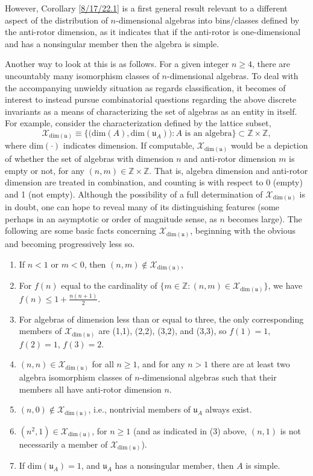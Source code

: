\documentclass{amsart}
\numberwithin{equation}{section}
\theoremstyle{definition}
\numberwithin{theorem}{section}
\begin{document}
However, Corollary \ref{8/17/22.1} is a first general result relevant to a different aspect of the distribution of $n$-dimensional algebras into bins/classes defined by the anti-rotor dimension, as it indicates that if the anti-rotor is one-dimensional and has a nonsingular member then the algebra is simple.  

Another way to look at this is as follows.
For a given integer $n\ge 4$, there are uncountably many isomorphism classes of $n$-dimensional algebras.  To deal with the accompanying unwieldy situation as regards classification, it becomes of interest to instead pursue combinatorial questions regarding the above discrete invariants as a means of characterizing the set of algebras as an entity in itself.   For example, consider the characterization defined by the lattice subset, \[ \mathcal{X}_{\text{dim}(\mathfrak{u})} \equiv \big\{\big(\text{dim}(A),\text{dim}(\mathfrak{u}_A)\big): A \text{ is an algebra}\big\} \subset \mathbb{Z}\times\mathbb{Z},\] where $\text{dim}(\cdot)$ indicates dimension.  If computable, $\mathcal{X}_{\text{dim}(\mathfrak{u})}$ would be a depiction of whether the set of algebras with dimension $n$ and anti-rotor dimension $m$ is empty or not, for any $(n,m)\in \mathbb{Z}\times\mathbb{Z}$.  That is, algebra dimension and anti-rotor dimension are treated in combination, and counting is with respect to 0 (empty) and 1 (not empty). Although the possibility of a full determination of $\mathcal{X}_{\text{dim}(\mathfrak{u})}$ is in doubt, one can hope to reveal many of its distinguishing features (some perhaps in an  asymptotic or order of magnitude sense, as $n$ becomes large). The following are some basic facts concerning $\mathcal{X}_{\text{dim}(\mathfrak{u})}$, beginning with the obvious and becoming progressively less so.

  \begin{enumerate} \item If $n<1$ or $m<0$, then $(n,m)\notin \mathcal{X}_{\text{dim}(\mathfrak{u})}$, \item  For $f(n)$ equal to the cardinality of $\{m\in\mathbb{Z}:(n,m)\in \mathcal{X}_{\text{dim}(\mathfrak{u})}\}$, we have $f(n)\le  1+\frac{n(n+1)}{2}$. \item For algebras of dimension less than or equal to three, the only corresponding members of $\mathcal{X}_{\text{dim}(\mathfrak{u})}$ are (1,1), (2,2), (3,2), and (3,3), so $f(1)=1$, $f(2)=1$, $f(3)=2$.  \item  $(n,n)\in \mathcal{X}_{\text{dim}(\mathfrak{u})}$ for all $n\ge 1$, and for any $n>1$ there are at least two algebra isomorphism classes of $n$-dimensional algebras such that their members all have anti-rotor dimension $n$.  \item $(n,0)\notin \mathcal{X}_{\text{dim}(\mathfrak{u})}$, i.e., nontrivial members of $\mathfrak{u}_A$ always exist.  \item  $(n^2,1)\in \mathcal{X}_{\text{dim}(\mathfrak{u})}$, for $n\ge 1$ (and as indicated in (3) above, $(n,1)$ is not necessarily a member of $\mathcal{X}_{\text{dim}(\mathfrak{u})}$). 
\item If $\text{dim}(\mathfrak{u}_A) = 1$, and $\mathfrak{u}_A$ has a nonsingular member, then $A$ is simple.
\end{enumerate}
  
\end{document}

